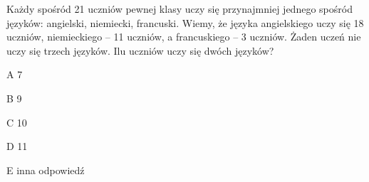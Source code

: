 \begin{tresc}
Każdy spośród 21 uczniów pewnej klasy uczy się przynajmniej jednego spośród języków: angielski, niemiecki, francuski. Wiemy, że języka angielskiego uczy się 18 uczniów, niemieckiego – 11 uczniów, a francuskiego – 3 uczniów. Żaden uczeń nie uczy się trzech języków. Ilu uczniów uczy się dwóch języków?
\end{tresc}
\begin{wariant}{A} 7 \end{wariant}
\begin{wariant}{B} 9 \end{wariant}
\begin{wariant}{C} 10 \end{wariant}
\begin{wariant}{D} 11 \end{wariant}
\begin{wariant}{E} inna odpowiedź \end{wariant}
